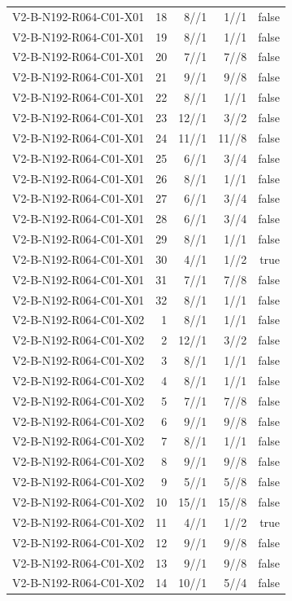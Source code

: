 {\begin{longtable}{lrrrr}
V2-B-N192-R064-C01-X01 & 18 & 8//1 & 1//1 & false \\
V2-B-N192-R064-C01-X01 & 19 & 8//1 & 1//1 & false \\
V2-B-N192-R064-C01-X01 & 20 & 7//1 & 7//8 & false \\
V2-B-N192-R064-C01-X01 & 21 & 9//1 & 9//8 & false \\
V2-B-N192-R064-C01-X01 & 22 & 8//1 & 1//1 & false \\
V2-B-N192-R064-C01-X01 & 23 & 12//1 & 3//2 & false \\
V2-B-N192-R064-C01-X01 & 24 & 11//1 & 11//8 & false \\
V2-B-N192-R064-C01-X01 & 25 & 6//1 & 3//4 & false \\
V2-B-N192-R064-C01-X01 & 26 & 8//1 & 1//1 & false \\
V2-B-N192-R064-C01-X01 & 27 & 6//1 & 3//4 & false \\
V2-B-N192-R064-C01-X01 & 28 & 6//1 & 3//4 & false \\
V2-B-N192-R064-C01-X01 & 29 & 8//1 & 1//1 & false \\
V2-B-N192-R064-C01-X01 & 30 & 4//1 & 1//2 & true \\
V2-B-N192-R064-C01-X01 & 31 & 7//1 & 7//8 & false \\
V2-B-N192-R064-C01-X01 & 32 & 8//1 & 1//1 & false \\
V2-B-N192-R064-C01-X02 & 1 & 8//1 & 1//1 & false \\
V2-B-N192-R064-C01-X02 & 2 & 12//1 & 3//2 & false \\
V2-B-N192-R064-C01-X02 & 3 & 8//1 & 1//1 & false \\
V2-B-N192-R064-C01-X02 & 4 & 8//1 & 1//1 & false \\
V2-B-N192-R064-C01-X02 & 5 & 7//1 & 7//8 & false \\
V2-B-N192-R064-C01-X02 & 6 & 9//1 & 9//8 & false \\
V2-B-N192-R064-C01-X02 & 7 & 8//1 & 1//1 & false \\
V2-B-N192-R064-C01-X02 & 8 & 9//1 & 9//8 & false \\
V2-B-N192-R064-C01-X02 & 9 & 5//1 & 5//8 & false \\
V2-B-N192-R064-C01-X02 & 10 & 15//1 & 15//8 & false \\
V2-B-N192-R064-C01-X02 & 11 & 4//1 & 1//2 & true \\
V2-B-N192-R064-C01-X02 & 12 & 9//1 & 9//8 & false \\
V2-B-N192-R064-C01-X02 & 13 & 9//1 & 9//8 & false \\
V2-B-N192-R064-C01-X02 & 14 & 10//1 & 5//4 & false \\

\end{longtable}}
